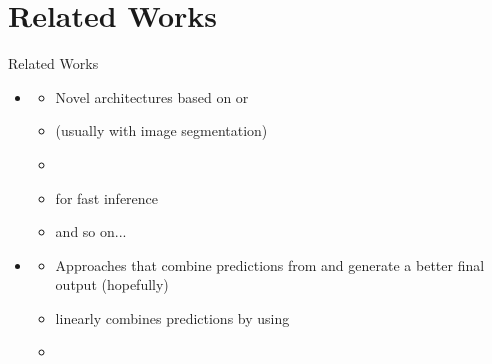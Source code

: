 \documentclass{cubeamer}
\begin{document}
\section{Related Works}
\begin{frame}{Related Works}
    \begin{itemize}
        \item {}
        \begin{itemize}
            \item Novel architectures based on  or 
            \item {} (usually with image segmentation)
            \item {}
            \item {} for fast inference
            \item and so on...
        \end{itemize}
        \item {}
        \begin{itemize}
            \item Approaches that combine predictions from  and generate a better final output (hopefully)
            \item {} linearly combines predictions by using 
            \item {} \cite{ensemble_survey}
        \end{itemize}
    \end{itemize}
\end{frame}
\end{document}

